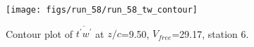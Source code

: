 \begin{figure}[H]
\centering
\texttt{[image: figs/run\_58/run\_58\_tw\_contour]}
\caption{Contour plot of $\overline{t^\prime w^\prime}$ at $z/c$=9.50, $V_{free}$=29.17, station 6.}
\label{fig:run_58_tw_contour}
\end{figure}


